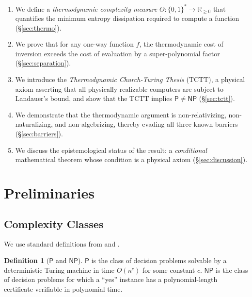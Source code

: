 \documentclass[12pt, a4paper]{article}
\theoremstyle{plain}
\theoremstyle{definition}
\newtheorem{definition}[theorem]{Definition}
\theoremstyle{remark}
\newcommand{\R}{\mathbb{R}}
\newcommand{\Pc}{\mathsf{P}}
\newcommand{\NPc}{\mathsf{NP}}
\begin{document}
\begin{enumerate}
  \item We define a \emph{thermodynamic complexity measure}
    $\Theta: \{0,1\}^* \to \R_{\geq 0}$ that quantifies the minimum
    entropy dissipation required to compute a function (\S\ref{sec:thermo}).

  \item We prove that for any one-way function $f$, the thermodynamic
    cost of inversion exceeds the cost of evaluation by a super-polynomial
    factor (\S\ref{sec:separation}).

  \item We introduce the \emph{Thermodynamic Church-Turing Thesis} (TCTT),
    a physical axiom asserting that all physically realizable computers
    are subject to Landauer's bound, and show that the TCTT implies
    $\Pc \neq \NPc$ (\S\ref{sec:tctt}).

  \item We demonstrate that the thermodynamic argument is non-relativizing,
    non-naturalizing, and non-algebrizing, thereby evading all three known
    barriers (\S\ref{sec:barriers}).

  \item We discuss the epistemological status of the result: a
    \emph{conditional} mathematical theorem whose condition is a physical
    axiom (\S\ref{sec:discussion}).
\end{enumerate}

\section{Preliminaries}\label{sec:prelim}

\subsection{Complexity Classes}

We use standard definitions from \citet{AroraBarakBook} and \citet{Sipser2013}.

\begin{definition}[$\Pc$ and $\NPc$]
  $\Pc$ is the class of decision problems solvable by a deterministic
  Turing machine in time $O(n^c)$ for some constant $c$.
  $\NPc$ is the class of decision problems for which
  a ``yes'' instance has a polynomial-length certificate verifiable in
  polynomial time.
\end{definition}
\end{document}
